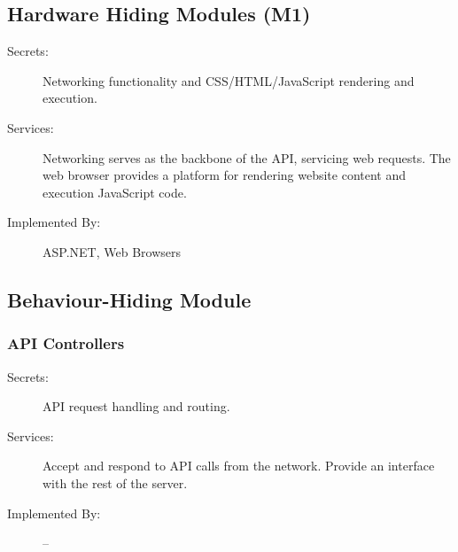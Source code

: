 \documentclass[12pt, titlepage]{article}
\begin{document}


\subsection{Hardware Hiding Modules (M1)}

\begin{description}
\item[Secrets:] Networking functionality and CSS/HTML/JavaScript rendering and
    execution.
\item[Services:]Networking serves as the backbone of the API, servicing web
    requests. The web browser provides a platform for rendering website content
    and execution JavaScript code.
\item[Implemented By:] ASP.NET, Web Browsers
\end{description}

\subsection{Behaviour-Hiding Module}

\subsubsection{API Controllers}

\begin{description}
\item[Secrets:] API request handling and routing.
\item[Services:] Accept and respond to API calls from the network. Provide an
    interface with the rest of the server.
\item[Implemented By:] --
\end{description}
\end{document}
